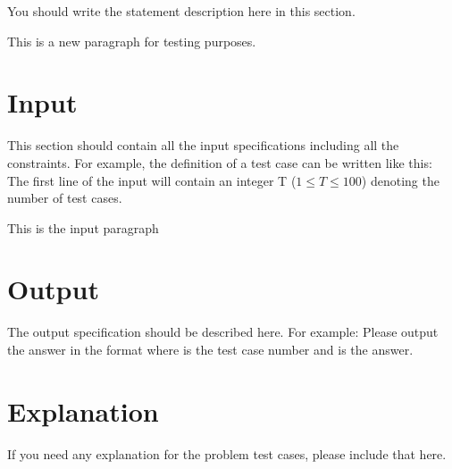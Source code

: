 You should write the statement description here in this section.

This is a new paragraph for testing purposes.

\section*{Input}

This section should contain all the input specifications including all the
constraints. For example, the definition of a test case can be written like
this: The first line of the input will contain an integer T ($1 \le T \le 100$)
denoting the number of test cases.

This is the input paragraph

\section*{Output}

The output specification should be described here. For example: Please
output the answer in the format  where  is the test case
number and  is the answer.

\section*{Explanation}
If you need any explanation for the problem test cases, please include
that here.
